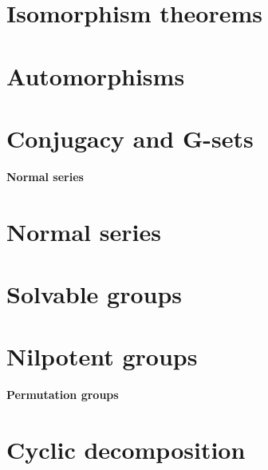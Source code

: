 \documentclass[twocolumn]{article}
\begin{document}
\section{Isomorphism theorems}
\setcounter{defi}{0}
\setcounter{teo}{0}
\setcounter{coro}{0}


\section{Automorphisms}
\setcounter{defi}{0}
\setcounter{teo}{0}
\setcounter{coro}{0}


\section{Conjugacy and G-sets}
\setcounter{defi}{0}
\setcounter{teo}{0}
\setcounter{coro}{0}

\textbf{\Huge Normal series}
\section{Normal series}
\setcounter{defi}{0}
\setcounter{teo}{0}
\setcounter{coro}{0}


\section{Solvable groups}
\setcounter{defi}{0}
\setcounter{teo}{0}
\setcounter{coro}{0}


\section{Nilpotent groups}
\setcounter{defi}{0}
\setcounter{teo}{0}
\setcounter{coro}{0}



\textbf{\huge Permutation groups}
\section{Cyclic decomposition}
\setcounter{defi}{0}
\setcounter{teo}{0}
\setcounter{coro}{0}

\end{document}
